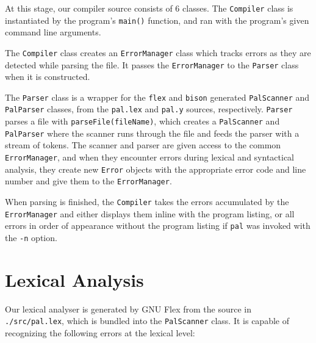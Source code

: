 \documentclass{article}
\begin{document}
At this stage, our compiler source consists of 6 classes. The \texttt{Compiler} class is instantiated by 
the program's \texttt{main()} function, and ran with the program's given command line arguments. 

The \texttt{Compiler} class creates an \texttt{ErrorManager}
class which tracks errors as they are detected while parsing the file. It passes the \texttt{ErrorManager}
to the \texttt{Parser} class when it is constructed.

The \texttt{Parser} class is a wrapper for the \texttt{flex} and \texttt{bison}
generated \texttt{PalScanner} and \texttt{PalParser} classes, from the
\texttt{pal.lex} and \texttt{pal.y} sources, respectively. \texttt{Parser}
parses a file with \texttt{parseFile(fileName)}, which creates a
\texttt{PalScanner} and \texttt{PalParser} where the scanner runs through
the file and feeds the parser with a stream of tokens.  The scanner and
parser are given access to the common \texttt{ErrorManager}, and when they
encounter errors during lexical and syntactical analysis, they create new
\texttt{Error} objects with the appropriate error code and line number and
give them to the \texttt{ErrorManager}.

When parsing is finished, the \texttt{Compiler} takes the errors accumulated by
the \texttt{ErrorManager} and either displays them inline with the program
listing, or all errors in order of appearance without the program listing if 
\texttt{pal} was invoked with the \texttt{-n} option.


\section*{Lexical Analysis}

Our lexical analyser is generated by GNU Flex from the source in \texttt{./src/pal.lex}, which
is bundled into the \texttt{PalScanner} class. It is capable of recognizing the following
errors at the lexical level:
\end{document}

